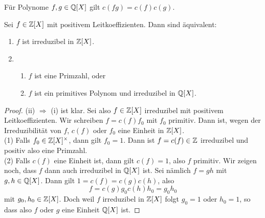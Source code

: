 \documentclass{book}
\begin{document}
\begin{cor}
    \label{cor:inhalt}
    Für Polynome $f,g \in \mathbb{Q}[X]$ gilt $c(fg) = c(f)c(g)$. 
\end{cor}

\begin{thm}
    \label{thm:gauß}
    Sei $f \in \mathbb{Z}[X]$ mit positivem Leitkoeffizienten. 
    Dann sind äquivalent:
    \begin{enumerate}[label=(\roman *)]
        \item $f$ ist irreduzibel in $\mathbb{Z}[X]$.
        \item \begin{enumerate}
            \item $f$ ist eine Primzahl, oder
            \item $f$ ist ein primitives Polynom und irreduzibel in $\mathbb{Q}[X]$.
        \end{enumerate}
    \end{enumerate}
\end{thm}
\begin{proof}
    (ii) $\Rightarrow$ (i) ist klar. Sei also $f \in \mathbb{Z}[X]$ irreduzibel mit
    positivem Leitkoeffizienten. Wir schreiben $f = c(f) f_0$ mit $f_0$
    primitiv. Dann ist, wegen der Irreduzibilität von $f$, $c(f)$ oder $f_0$ eine
    Einheit in $\mathbb{Z}[X]$.\\

    \noindent
    (1) Falls $f_0 \in \mathbb{Z}[X]^{\times}$, dann gilt $f_0 = 1$. Dann ist $f = c(f) \in \mathbb{Z}$ irreduzibel und positiv also eine Primzahl.\\

    \noindent
    (2) Falls $c(f)$ eine Einheit ist, dann gilt $c(f) = 1$,
    also $f$ primitiv. Wir zeigen noch, dass $f$ dann auch irreduzibel in
    $\mathbb{Q}[X]$ ist. Sei nämlich $f = gh$ mit $g,h \in \mathbb{Q}[X]$. Dann gilt $1 =
    c(f) = c(g)c(h)$, also 
    \[
        f = c(g)g_0 c(h)h_0 = g_0 h_0 
    \]
    mit $g_0,h_0 \in \mathbb{Z}[X]$. Doch weil $f$ irreduzibel in $\mathbb{Z}[X]$ folgt $g_0
    = 1$ oder $h_0 = 1$, so dass also $f$ oder $g$ eine Einheit $\mathbb{Q}[X]$ ist. 
\end{proof}
\end{document}
